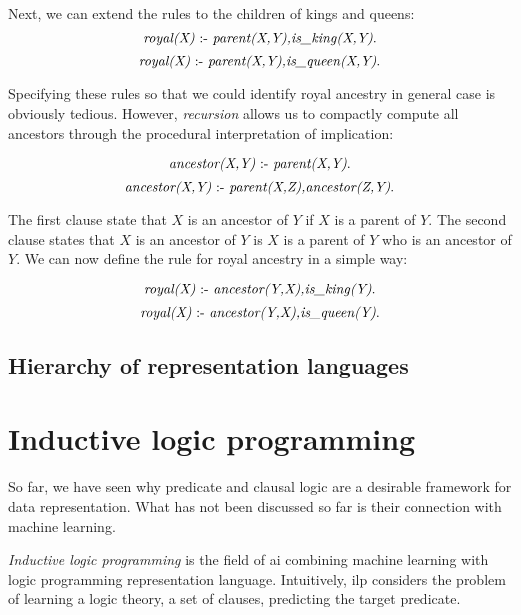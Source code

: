Next, we can extend the rules to the children of kings and queens:
$$ \text{\textit{royal(X)}} \text{ :- } \text{\textit{parent(X,Y),is\_king(X,Y)}}.$$
$$ \text{\textit{royal(X)}} \text{ :- } \text{\textit{parent(X,Y),is\_queen(X,Y)}}.$$

Specifying these rules so that we could identify royal ancestry in general case is obviously tedious.
However, \textit{recursion} allows us to compactly compute all ancestors through the procedural interpretation of implication:

$$ \text{\textit{ancestor(X,Y)}} \text{ :- } \textit{parent(X,Y)}.$$
$$ \text{\textit{ancestor(X,Y)}} \text{ :- } \textit{parent(X,Z),ancestor(Z,Y)}.$$

The first clause state that $X$ is an ancestor of $Y$ if $X$ is a parent of $Y$.
The second clause states that $X$ is an ancestor of $Y$ is $X$ is a parent of $Y$ who is an ancestor of $Y$.
We can now define the rule for royal ancestry in a simple way:

$$ \text{\textit{royal(X)}} \text{ :- } \text{\textit{ancestor(Y,X),is\_king(Y)}}.$$
$$ \text{\textit{royal(X)}} \text{ :- } \text{\textit{ancestor(Y,X),is\_queen(Y)}}.$$












\subsection{Hierarchy of representation languages}





\section{Inductive logic programming}


So far, we have seen why predicate and clausal logic are a desirable framework for data representation.
What has not been discussed so far is their connection with machine learning.


\textit{Inductive logic programming} \cite{LucRLbook,Lavrac:1993:ILP:562956} is the field of \gls{ai} combining machine learning with logic programming representation language.
Intuitively, \gls{ilp} considers the problem of learning a logic theory, a set of clauses, predicting the target predicate.


